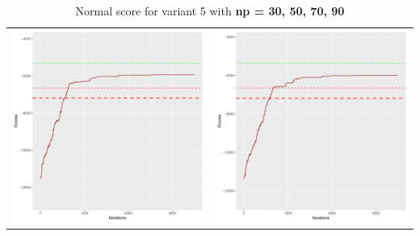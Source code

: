 \documentclass[]{scrartcl}
\begin{document}
\begin{table}[h!]
\begin{tabular}{cc}
\includegraphics[scale = 0.4]{./figs/alarm/v5/70/boundsEvolution-3502.pdf} & 
\includegraphics[scale = 0.4]{./figs/alarm/v5/90/boundsEvolution-3502.pdf} \\
\end{tabular}
\caption{Normal score for variant 5 with \textbf{np =  30, 50, 70, 90 }}
\end{table}
\end{document}
